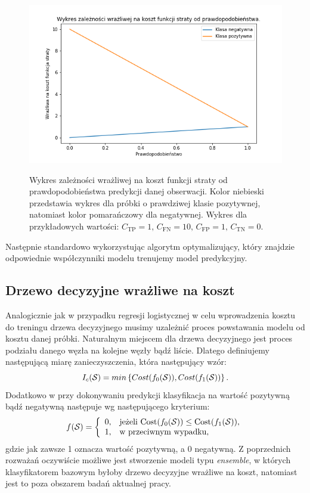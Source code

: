 \documentclass{book}
\begin{document}
		\begin{figure}
			\includegraphics[width=\linewidth]{images/cost_sensitive_ce.png}
			\label{cost-sensitive-loss-function}
			\caption{Wykres zależności wrażliwej na koszt funkcji straty od prawdopodobieństwa predykcji danej obserwacji. Kolor niebieski przedstawia wykres dla próbki o prawdziwej klasie pozytywnej, natomiast kolor pomarańczowy dla negatywnej. Wykres dla przykładowych wartości: $C_{\text{TP}} = 1 \text{, } C_{\text{FN}} = 10 \text{, } C_{\text{FP}} = 1 \text{, } C_{\text{TN}} = 0$.}
		\end{figure}
	
		Następnie standardowo wykorzystując algorytm optymalizujący, który znajdzie odpowiednie współczynniki modelu trenujemy model predykcyjny.
\subsection{Drzewo decyzyjne wrażliwe na koszt}
	Analogicznie jak w przypadku regresji logistycznej w celu wprowadzenia kosztu do treningu drzewa decyzyjnego musimy uzależnić proces powstawania modelu od kosztu danej próbki. Naturalnym miejscem dla drzewa decyzyjnego jest proces podziału danego węzła na kolejne węzły bądź liście. Dlatego definiujemy następującą miarę zanieczyszczenia, która następujący wzór:
	$$ I_c(\mathcal{S}) = min \left\{ Cost(f_0(\mathcal{S})), Cost(f_1(\mathcal{S})) \right\} \text{.}$$
	Dodatkowo w przy dokonywaniu predykcji klasyfikacja na wartość pozytywną bądź negatywną następuje wg następującego kryterium:
	$$ f(\mathcal{S}) =  \left\{
		\begin{array}{rl}
			0, &\mbox{jeżeli $\text{Cost}(f_0(\mathcal{S})) \leq \text{Cost}(f_1(\mathcal{S}))$}, \\
			1, &\mbox{w przeciwnym wypadku},
		\end{array}{}
	\right.
	$$
	gdzie jak zawsze 1 oznacza wartość pozytywną, a 0 negatywną. 
	Z poprzednich rozważań oczywiście możliwe jest stworzenie modeli typu \textit{ensemble}, w których klasyfikatorem bazowym byłoby drzewo decyzyjne wrażliwe na koszt, natomiast jest to poza obszarem badań aktualnej pracy.
\end{document}
